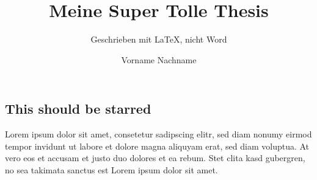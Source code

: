 \documentclass[a4paper,12pt]{report}
\author{Vorname Nachname}
\title{Meine Super Tolle Thesis}
\subtitle{Geschrieben mit \LaTeX , nicht Word}
\begin{document}
\setlength{\parindent}{0pt}
\setlength{\parskip}{1.2ex plus 0.5ex minus 0.2ex}

\hstitlepage

\begin{frontmatter}
\chapter*{This should be starred}
Lorem ipsum dolor sit amet, consetetur sadipscing elitr, sed diam nonumy eirmod tempor invidunt ut labore et dolore magna aliquyam erat, sed diam voluptua. At vero eos et accusam et justo duo dolores et ea rebum. Stet clita kasd gubergren, no sea takimata sanctus est Lorem ipsum dolor sit amet.


\tableofcontents
\end{frontmatter}


\cleardoublepage
{}
{}
\listoftables

\cleardoublepage
{}
{}
\listoffigures

\printbibliography[heading=bibintoc, title={Literatur}]

\end{document}
